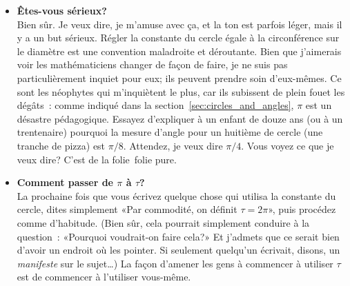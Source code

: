 \begin{itemize}

  \item \textbf{Êtes-vous sérieux\ns?} \\ Bien sûr. Je veux dire, je m'amuse avec
  ça, et la ton est parfois léger, mais il y a un but sérieux. Régler la
  constante du cercle égale à la circonférence sur le diamètre est une
  convention maladroite et déroutante. Bien que j'aimerais voir les
  mathématiciens changer de façon de faire, je ne suis pas particulièrement
  inquiet pour eux\ns; ils peuvent prendre soin d'eux-mêmes. Ce sont les
  néophytes qui m'inquiètent le plus, car ils subissent de plein fouet les
  dégâts~: comme indiqué dans la section~\ref{sec:circles_and_angles}, $\pi$ est
  un désastre pédagogique. Essayez d'expliquer à un enfant de douze ans (ou à un
  trentenaire) pourquoi la mesure d'angle pour un huitième de cercle (une 
  tranche de pizza) est $\pi/8$. Attendez, je veux dire $\pi/4$. Vous voyez ce
  que je veux dire\ns? C'est de la folie\textellipsis\ folie pure.

  \item \textbf{Comment passer de $\pi$ à $\tau$\ns?} \\ La prochaine fois que
  vous écrivez quelque chose qui utilisa la constante du cercle, dites
  simplement «\ns Par commodité, on définit $\tau=2\pi$\ns », puis procédez comme
  d'habitude. (Bien sûr, cela pourrait simplement conduire à la question~:
  «\ns Pourquoi voudrait-on faire cela\ns?\ns » Et j'admets que ce serait bien
  d'avoir un endroit où les pointer. Si seulement quelqu'un écrivait, disons, un
  \emph{manifeste} sur le sujet\ldots) La façon d'amener les gens à commencer à
  utiliser $\tau$ est de commencer à l'utiliser vous-même.


\end{itemize}
